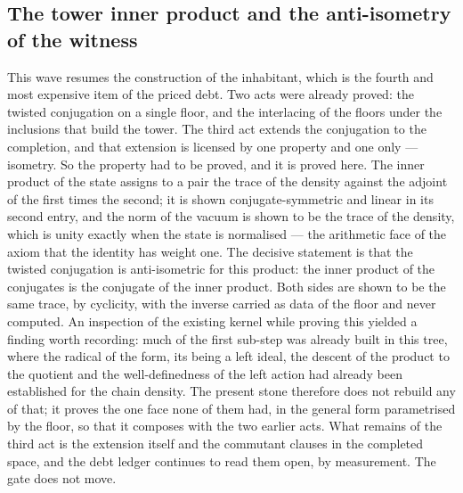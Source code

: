 \documentclass[11pt]{article}
\theoremstyle{definition}\newtheorem{deriv}{Derivation}
\begin{document}
\subsection*{The tower inner product and the anti-isometry of the witness}This wave resumes the construction of the inhabitant, which is the fourth and most expensive item of the priced debt. Two acts were already proved: the twisted conjugation on a single floor, and the interlacing of the floors under the inclusions that build the tower. The third act extends the conjugation to the completion, and that extension is licensed by one property and one only --- isometry. So the property had to be proved, and it is proved here. The inner product of the state assigns to a pair the trace of the density against the adjoint of the first times the second; it is shown conjugate-symmetric and linear in its second entry, and the norm of the vacuum is shown to be the trace of the density, which is unity exactly when the state is normalised --- the arithmetic face of the axiom that the identity has weight one. The decisive statement is that the twisted conjugation is anti-isometric for this product: the inner product of the conjugates is the conjugate of the inner product. Both sides are shown to be the same trace, by cyclicity, with the inverse carried as data of the floor and never computed. An inspection of the existing kernel while proving this yielded a finding worth recording: much of the first sub-step was already built in this tree, where the radical of the form, its being a left ideal, the descent of the product to the quotient and the well-definedness of the left action had already been established for the chain density. The present stone therefore does not rebuild any of that; it proves the one face none of them had, in the general form parametrised by the floor, so that it composes with the two earlier acts. What remains of the third act is the extension itself and the commutant clauses in the completed space, and the debt ledger continues to read them open, by measurement. The gate does not move.
\end{document}
